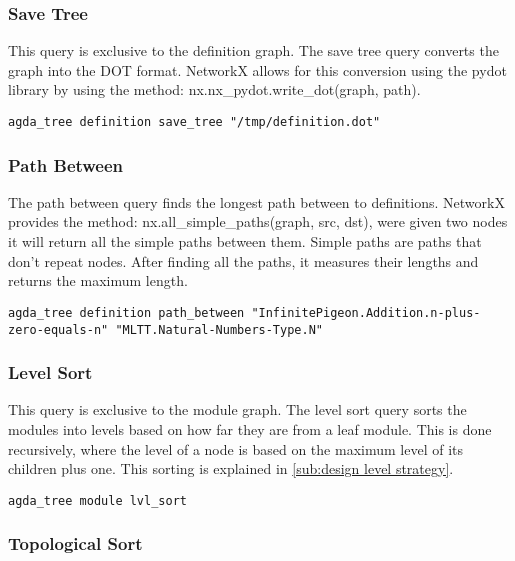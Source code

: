 \subsubsection{Save Tree}

This query is exclusive to the definition graph. The save tree query converts
the graph into the DOT format. NetworkX allows for this conversion using the
pydot library by using the method: \textsf{nx.nx\_pydot.write\_dot(graph, path)}.

\begin{lstlisting}
agda_tree definition save_tree "/tmp/definition.dot"
\end{lstlisting}

\subsubsection{Path Between}

The path between query finds the longest path between to definitions. NetworkX
provides the method: \textsf{nx.all\_simple\_paths(graph, src, dst)}, were given
two nodes it will return all the simple paths between them. Simple paths are
paths that don't repeat nodes. After finding all the paths, it measures their
lengths and returns the maximum length.

\begin{lstlisting}
agda_tree definition path_between "InfinitePigeon.Addition.n-plus-zero-equals-n" "MLTT.Natural-Numbers-Type.N"
\end{lstlisting}

\subsubsection{Level Sort}

This query is exclusive to the module graph. The level sort query sorts the
modules into levels based on how far they are from a leaf module. This is done
recursively, where the level of a node is based on the maximum level of its
children plus one. This sorting is explained in \cref{sub:design level strategy}.

\begin{lstlisting}
agda_tree module lvl_sort
\end{lstlisting}

\subsubsection{Topological Sort}

